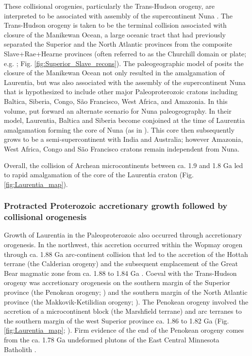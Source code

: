 \documentclass[twocolumn, switch]{article} %
\begin{document}
These collisional orogenies, particularly the Trans-Hudson orogeny, are interpreted to be associated with assembly of the supercontinent Nuna \citep{Zhang2012a,Pehrsson2015a}. The Trans-Hudson orogeny is taken to be the terminal collision associated with closure of the Manikewan Ocean, a large oceanic tract that had previously separated the Superior and the North Atlantic provinces from the composite Slave+Rae+Hearne provinces (often referred to as the Churchill domain or plate; e.g. \citealp{Skipton2016a, Weller2017a}; Fig. \ref{fig:Superior_Slave_recons}). The paleogeographic model of \cite{Pehrsson2015a} posits the closure of the Manikewan Ocean not only resulted in the amalgamation of Laurentia, but was also associated with the assembly of the supercontinent Nuna that is hypothesized to include other major Paleoproterozoic cratons including Baltica, Siberia, Congo, S\~ao Francisco, West Africa, and Amazonia. In this volume, \cite{Elming2021a} put forward an alternate scenario for Nuna paleogeography. In their model,  Laurentia, Baltica and Siberia become conjoined at the time of Laurentia amalgamation forming the core of Nuna (as in \citealp{Evans2011a}). This core then subsequently grows to be a semi-supercontinent with India and Australia; however Amazonia, West Africa, Congo and S\~ao Francisco cratons remain independent from Nuna.

Overall, the collision of Archean microcontinents between ca. 1.9 and 1.8 Ga led to rapid amalgamation of the core of the Laurentia craton (Fig. \ref{fig:Laurentia_map}). 

\subsubsection{Protracted Proterozoic accretionary growth followed by collisional orogenesis}

Growth of Laurentia in the Paleoproterozoic also occurred through accretionary orogenesis. In the northwest, this accretion occurred within the Wopmay orogen through ca. 1.88 Ga arc-continent collision that led to the accretion of the Hottah terrane (the Calderian orogeny) and the subsequent emplacement of the Great Bear magmatic zone from ca. 1.88 to 1.84 Ga \citep{Hildebrand2009a}. Coeval with the Trans-Hudson orogeny was accretionary orogenesis on the southern margin of the Superior province (the Penokean orogeny; \citealp{Schulz2007a}) and the southern margin of the North Atlantic province (the Makkovik-Ketilidian orogeny; \citealp{Kerr1996a}). The Penokean orogeny involved the accretion of a microcontinent block (the Marshfield terrane) and arc terranes to the southern margin of the west Superior province ca. 1.86 to 1.82 Ga (Fig. \ref{fig:Laurentia_map}; \citealp{Schulz2007a}). Firm evidence of the end of the Penokean orogeny comes from the ca. 1.78 Ga undeformed plutons of the East Central Minnesota Batholith \citep{Holm2005a}.
\end{document}
